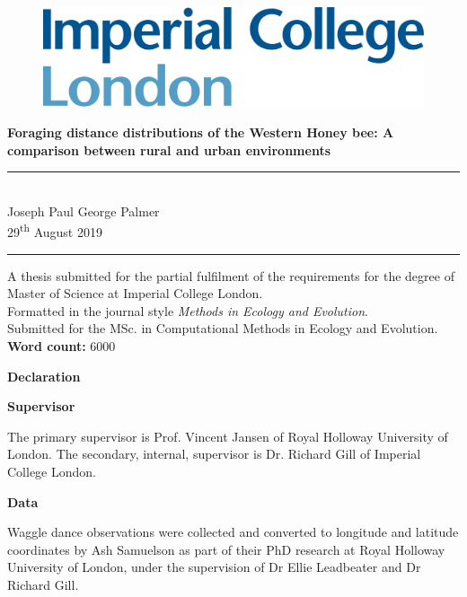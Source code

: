 \documentclass[11pt,usenames,dvipsnames]{article}
\begin{document}
\begin{titlepage}

\begin{figure}[H]
	\includegraphics[scale=0.13]{../Poster/Images/ICL_Logo.png}
\end{figure}
\vfill
\begin{center}
\noindent
\huge{
\textbf{Foraging distance distributions of the Western Honey bee: A comparison between rural and urban environments}
}\\[1.5cm]
\noindent\rule{\textwidth}{0.05pt}\\[0.2cm]
\noindent
\Large{
	Joseph Paul George Palmer\\
	29\textsuperscript{th} August 2019
}\\

\noindent\rule{\textwidth}{0.05pt}
\vfill
\large{A thesis submitted for the partial fulfilment of the requirements for the degree of Master of Science at Imperial College London.\\[0.5cm]
	Formatted in the journal style \textit{Methods in Ecology and Evolution}.\\
	Submitted for the MSc. in Computational Methods in Ecology and Evolution.\\[1.5cm]
	\textbf{Word count:} 6000
}\\
\vfill
\end{center}

\end{titlepage}

\newpage

\begin{center}
	\Large{\textbf{Declaration}}
\end{center}
\noindent
\Large{\textbf{Supervisor}}

\noindent
The primary supervisor is Prof. Vincent Jansen of Royal Holloway University of London. The secondary, internal, supervisor is Dr. Richard Gill of Imperial College London.

\noindent
\Large{\textbf{Data}}

\noindent
Waggle dance observations were collected and converted to longitude and latitude coordinates by Ash Samuelson as part of their PhD research at Royal Holloway University of London, under the supervision of Dr Ellie Leadbeater and Dr Richard Gill.
\end{document}

